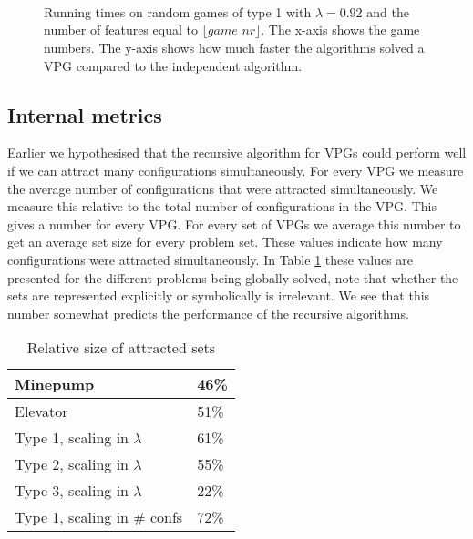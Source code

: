 \begin{figure}[H]
	\centering
	\begin{multicols}{2}
		\\\vfill
		\\
		\\\vfill
		
	\end{multicols}
	\caption{Running times on random games of type 1 with $\lambda = 0.92$ and the number of features equal to $\lfloor \textit{game nr}\rfloor$. The x-axis shows the game numbers. The y-axis shows how much faster the algorithms solved a VPG compared to the independent algorithm.}
	\label{fig:results_scalegames}
\end{figure}%

\subsection{Internal metrics}
Earlier we hypothesised that the recursive algorithm for VPGs could perform well if we can attract many configurations simultaneously. For every VPG we measure the average number of configurations that were attracted simultaneously. We measure this relative to the total number of configurations in the VPG. This gives a number for every VPG. For every set of VPGs we average this number to get an average set size for every problem set. These values indicate how many configurations were attracted simultaneously. In Table \ref{tab_attracted_set_size} these values are presented for the different problems being globally solved, note that whether the sets are represented explicitly or symbolically is irrelevant. We see that this number somewhat predicts the performance of the recursive algorithms.

\begin{table}[h]
	\centering
	\begin{tabular}{|l|l|}
		\hline
		Minepump& 46\%\\ \hline
		Elevator& 51\%\\ \hline
		Type 1, scaling in $\lambda$& 61\%\\ \hline
		Type 2, scaling in $\lambda$& 55\%\\ \hline
		Type 3, scaling in $\lambda$& 22\%\\ \hline
		Type 1, scaling in \# confs& 72\%\\ \hline
	\end{tabular}
	\caption{Relative size of attracted sets}
	\label{tab_attracted_set_size}
\end{table}

